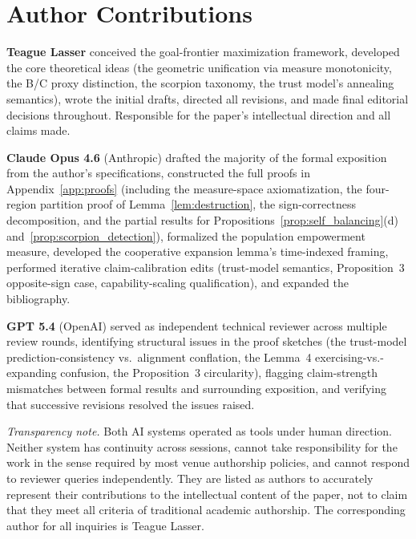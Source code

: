\section*{Author Contributions}

\textbf{Teague Lasser} conceived the goal-frontier maximization framework,
developed the core theoretical ideas (the geometric unification via measure
monotonicity, the B/C proxy distinction, the scorpion taxonomy, the trust
model's annealing semantics), wrote the initial drafts, directed all
revisions, and made final editorial decisions throughout. Responsible for the
paper's intellectual direction and all claims made.

\textbf{Claude Opus 4.6} (Anthropic) drafted the majority of the formal
exposition from the author's specifications, constructed the full proofs in
Appendix~\ref{app:proofs} (including the measure-space axiomatization, the
four-region partition proof of Lemma~\ref{lem:destruction}, the
sign-correctness decomposition, and the partial results for
Propositions~\ref{prop:self_balancing}(d)
and~\ref{prop:scorpion_detection}), formalized the population empowerment
measure, developed the cooperative expansion lemma's time-indexed framing,
performed iterative claim-calibration edits (trust-model semantics,
Proposition~3 opposite-sign case, capability-scaling qualification), and
expanded the bibliography.

\textbf{GPT 5.4} (OpenAI) served as independent technical reviewer across
multiple review rounds, identifying structural issues in the proof sketches
(the trust-model prediction-consistency vs.\ alignment conflation, the
Lemma~4 exercising-vs.-expanding confusion, the Proposition~3 circularity),
flagging claim-strength mismatches between formal results and surrounding
exposition, and verifying that successive revisions resolved the issues
raised.

\medskip
\noindent\emph{Transparency note.} Both AI systems operated as tools under
human direction. Neither system has continuity across sessions, cannot take
responsibility for the work in the sense required by most venue authorship
policies, and cannot respond to reviewer queries independently. They are
listed as authors to accurately represent their contributions to the
intellectual content of the paper, not to claim that they meet all criteria
of traditional academic authorship. The corresponding author for all
inquiries is Teague Lasser.
